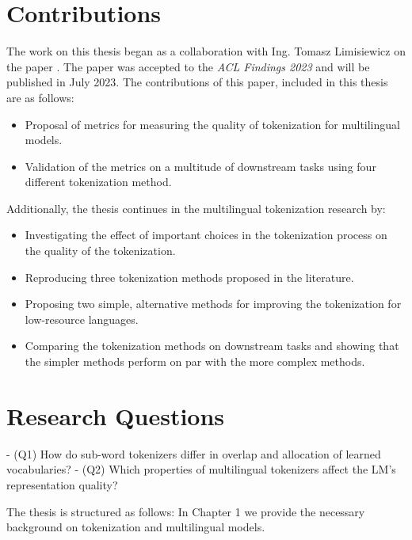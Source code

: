 \section{Contributions}

The work on this thesis began as a collaboration with Ing. Tomasz Limisiewicz on the paper . The paper was accepted to the \textit{ACL Findings 2023} and will be published in July 2023. The contributions of this paper, included in this thesis are as follows:

\begin{itemize}
    \item Proposal of metrics for measuring the quality of tokenization for multilingual models.
    \item Validation of the metrics on a multitude of downstream tasks using four different tokenization method.
\end{itemize}

Additionally, the thesis continues in the multilingual tokenization research by:

\begin{itemize}
    \item Investigating the effect of important choices in the tokenization process on the quality of the tokenization.
    \item Reproducing three tokenization methods proposed in the literature.
    \item Proposing two simple, alternative methods for improving the tokenization for low-resource languages.
    \item Comparing the tokenization methods on downstream tasks and showing that the simpler methods perform on par with the more complex methods.
\end{itemize}

\section{Research Questions}

- (Q1) How do sub-word tokenizers differ in overlap and allocation of learned vocabularies?
- (Q2) Which properties of multilingual tokenizers affect the LM’s representation quality?



The thesis is structured as follows: In Chapter 1 we provide the necessary background on tokenization and multilingual models.  

